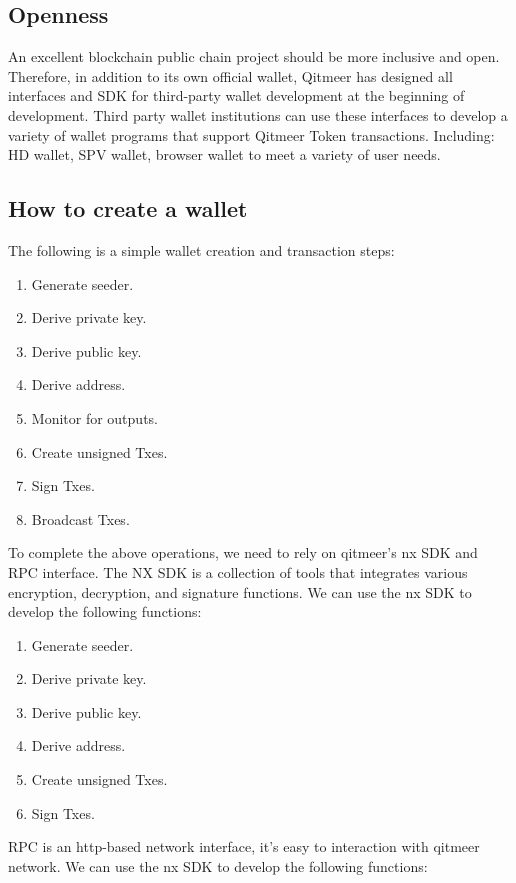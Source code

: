 \documentclass[a4paper,11pt]{article}
\begin{document}
\subsection*{Openness}
   An excellent blockchain public chain project should be more inclusive and open. Therefore, in addition to its own official wallet, Qitmeer has designed all interfaces and SDK for third-party wallet development at the beginning of development. Third party wallet institutions can use these interfaces to develop a variety of wallet programs that support Qitmeer Token transactions. Including: HD wallet, SPV wallet, browser wallet to meet a variety of user needs.
\subsection*{How to create a wallet}
   The following is a simple wallet creation and transaction steps:
\begin{enumerate}
	\item  Generate seeder.
    \item  Derive private key.
    \item  Derive public key.
    \item  Derive address.
    \item  Monitor for outputs.
    \item  Create unsigned Txes.
    \item  Sign Txes.
    \item  Broadcast Txes.
\end{enumerate}

   To complete the above operations, we need to rely on qitmeer's nx SDK and RPC interface.
   The NX SDK is a collection of tools that integrates various encryption, decryption, and signature functions. We can use the nx SDK to develop the following functions:
   \begin{enumerate}
     \item Generate seeder.
     \item Derive private key.
     \item Derive public key.
     \item Derive address.
     \item Create unsigned Txes.
	 \item Sign Txes.
   \end{enumerate}

   RPC is an http-based network interface, it’s easy to interaction with qitmeer network. We can use the nx SDK to develop the following functions:
\end{document}
